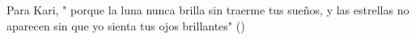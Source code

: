 \begin{dedication}
	
Para Kari, " porque la luna nunca brilla sin traerme tus sueños, y las estrellas no
   aparecen sin que yo sienta tus ojos brillantes" (\citeauthor*{poe_annabel_2014}) \\
\bigskip

\end{dedication}
